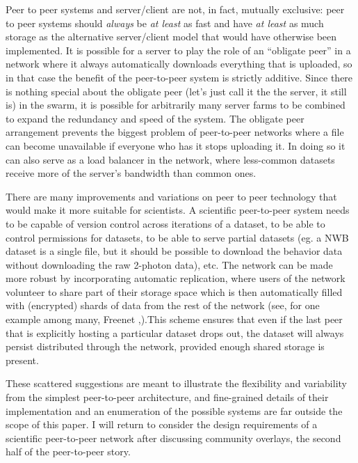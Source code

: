 \documentclass[nohyper]{tufte-book-jls}
\begin{document}
Peer to peer systems and server/client are not, in fact, mutually
exclusive: peer to peer systems should \emph{always} be \emph{at least}
as fast and have \emph{at least} as much storage as the alternative
server/client model that would have otherwise been implemented. It is
possible for a server to play the role of an ``obligate
peer''
in a network where it always automatically downloads everything that is
uploaded, so in that case the benefit of the peer-to-peer system is
strictly additive. Since there is nothing special about the obligate
peer (let's just call it the the server, it still is) in the swarm, it
is possible for arbitrarily many server farms to be combined to expand
the redundancy and speed of the system. The obligate peer arrangement
prevents the biggest problem of peer-to-peer networks where a file can
become unavailable if everyone who has it stops uploading it. In doing
so it can also serve as a load balancer in the network, where
less-common datasets receive more of the server's bandwidth than common
ones.

There are many improvements and variations on peer to peer technology
that would make it more suitable for scientists. A scientific
peer-to-peer system needs to be capable of version control across
iterations of a dataset, to be able to control permissions for datasets,
to be able to serve partial datasets (eg. a NWB dataset is a single
file, but it should be possible to download the behavior data without
downloading the raw 2-photon data), etc. The network can be made more
robust by incorporating automatic replication, where users of the
network volunteer to share part of their storage space which is then
automatically filled with (encrypted) shards of data from the rest of
the network (see, for one example among many, Freenet \cite{clarkeFreenetDistributedAnonymous2001},).This scheme ensures that
even if the last peer that is explicitly hosting a particular dataset
drops out, the dataset will always persist distributed through the
network, provided enough shared storage is present.

These scattered suggestions are meant to illustrate the flexibility and
variability from the simplest peer-to-peer architecture, and
fine-grained details of their implementation and an enumeration of the
possible systems are far outside the scope of this paper. I will return
to consider the design requirements of a scientific peer-to-peer network
after discussing community overlays, the second half of the peer-to-peer
story.
\end{document}
